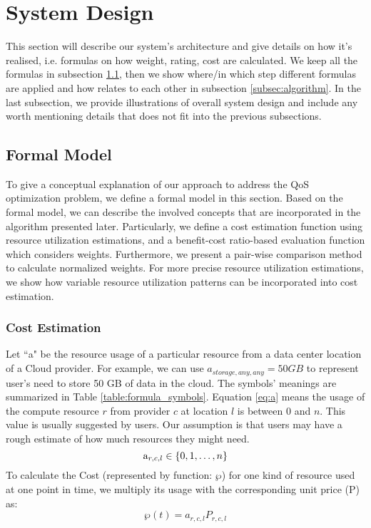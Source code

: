 \documentclass[journal]{IEEEtran}
\begin{document}
\section{System Design}\label{model}

This section will describe our system's architecture and give details on how it's realised, i.e. formulas on how weight, rating, cost are calculated. We keep all the formulas in subsection \ref{subsec:formal_model}, then we show where/in which step different formulas are applied and how relates to each other in subsection \ref{subsec:algorithm}. In the last subsection, we provide illustrations of overall system design and include any worth mentioning details that does not fit into the previous subsections.

\subsection{Formal Model }
\label{subsec:formal_model}
To give a conceptual explanation of our approach to address the QoS optimization problem, we define a formal model in this section. Based on the formal model, we can describe the involved concepts that are incorporated in the algorithm presented later. Particularly, we define a cost estimation function using resource utilization estimations, and a benefit-cost ratio-based evaluation function which considers weights. Furthermore, we present a pair-wise comparison method to calculate normalized weights. For more precise resource utilization estimations, we show how variable resource utilization patterns can be incorporated into cost estimation.


\subsubsection{Cost Estimation}

Let ``a" be the resource usage of a particular resource from a data center location of a Cloud provider. For example, we can use $a_{storage,any,any}=50 GB$ to represent user's need to store 50 GB of data in the cloud. The symbols' meanings are summarized in Table \ref{table:formula_symbols}. Equation \ref{eq:a} means the usage of the compute resource $r$ from provider $c$ at location $l$ is between $0$ and $n$. This value is usually suggested by users. Our assumption is that users may have a rough estimate of how much resources they might need.
\begin{equation}\label{eq:a}
{{\rm{a}}_{r,c,l}} \in \{ 0,1, \ldots ,n\}
\end{equation}
To calculate the Cost (represented by function: $\wp $) for one kind of resource used at one point in time, we multiply its usage with the corresponding unit price (P) as:
\begin{equation}\label{eq:p}
\wp (t) = {a_{r,c,l}}{P_{r,c,l}}
\end{equation}
\end{document}
